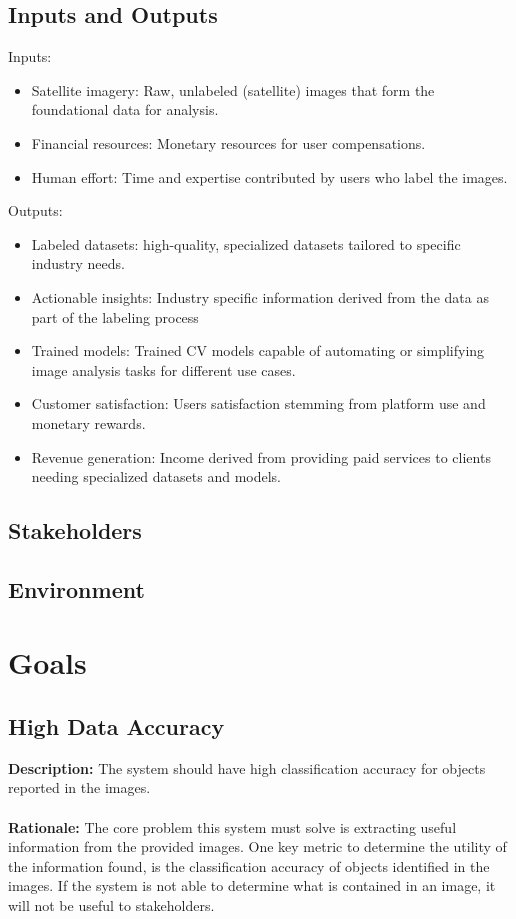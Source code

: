 \documentclass{article}
\begin{document}
\subsection{Inputs and Outputs}

Inputs:

\begin{itemize}
    \item Satellite imagery: Raw, unlabeled (satellite) images that form the foundational data for analysis.
    \item Financial resources: Monetary resources for user compensations.
    \item Human effort: Time and expertise contributed by users who label the images.
\end{itemize}

Outputs:

\begin{itemize}
    \item Labeled datasets: high-quality, specialized datasets tailored to specific industry needs.
    \item Actionable insights: Industry specific information derived from the data as part of the labeling process
    \item Trained models: Trained CV models capable of automating or simplifying image analysis tasks for different use cases.
    \item Customer satisfaction: Users satisfaction stemming from platform use and monetary rewards.
    \item Revenue generation: Income derived from providing paid services to clients needing specialized datasets and models.
\end{itemize}


\subsection{Stakeholders}

\subsection{Environment}


\section{Goals}
\subsection{High Data Accuracy}
\textbf{Description: }The system should have high classification accuracy for objects reported in the images. \\\\
\textbf{Rationale: }The core problem this system must solve is extracting useful information from the provided images.
 One key metric to determine the utility of the information found, is the classification accuracy of objects identified in the images. If the system is 
 not able to determine what is contained in an image, it will not be useful to stakeholders.
\end{document}
